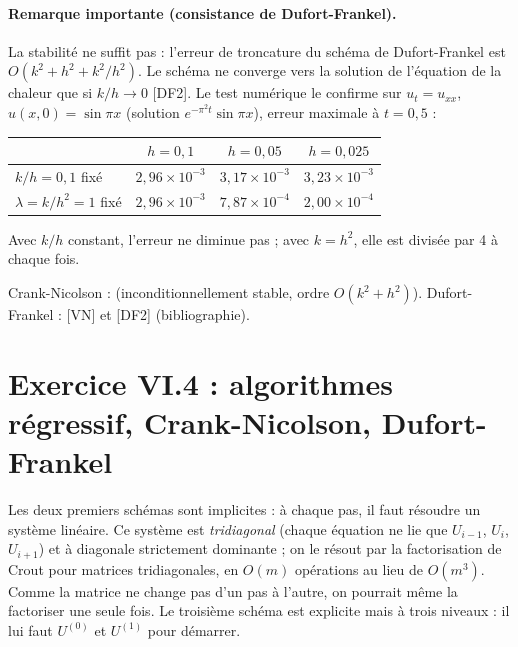 \paragraph{Remarque importante (consistance de Dufort-Frankel).} La stabilité ne
suffit pas : l'erreur de troncature du schéma de Dufort-Frankel est
$O(k^2 + h^2 + k^2/h^2)$. Le schéma ne converge vers la solution de
l'équation de la chaleur que si $k/h \to 0$ [DF2]. Le test numérique le
confirme sur $u_t = u_{xx}$, $u(x,0) = \sin\pi x$ (solution
$e^{-\pi^2t}\sin\pi x$), erreur maximale à $t = 0{,}5$ :
\begin{center}
\begin{tabular}{lccc}
  \toprule
  & $h = 0{,}1$ & $h = 0{,}05$ & $h = 0{,}025$\\ \midrule
  $k/h = 0{,}1$ fixé & $2{,}96\times 10^{-3}$ & $3{,}17\times 10^{-3}$ & $3{,}23\times 10^{-3}$\\
  $\lambda = k/h^2 = 1$ fixé & $2{,}96\times 10^{-3}$ & $7{,}87\times 10^{-4}$ & $2{,}00\times 10^{-4}$\\
  \bottomrule
\end{tabular}
\end{center}
Avec $k/h$ constant, l'erreur ne diminue pas ; avec $k = h^2$, elle est
divisée par 4 à chaque fois.

\Refs Crank-Nicolson :  (inconditionnellement stable, ordre
$O(k^2 + h^2)$). Dufort-Frankel : [VN] et [DF2] (bibliographie).

\section{Exercice VI.4 : algorithmes régressif, Crank-Nicolson, Dufort-Frankel}


\Pourquoi Les deux premiers schémas sont implicites : à chaque pas, il faut
résoudre un système linéaire. Ce système est \emph{tridiagonal} (chaque
équation ne lie que $U_{i-1}$, $U_i$, $U_{i+1}$) et à diagonale strictement
dominante ; on le résout par la factorisation de Crout pour matrices
tridiagonales, en $O(m)$ opérations au lieu de $O(m^3)$. Comme la matrice ne
change pas d'un pas à l'autre, on pourrait même la factoriser une seule fois.
Le troisième schéma est explicite mais à trois niveaux : il lui faut
$U^{(0)}$ et $U^{(1)}$ pour démarrer.

